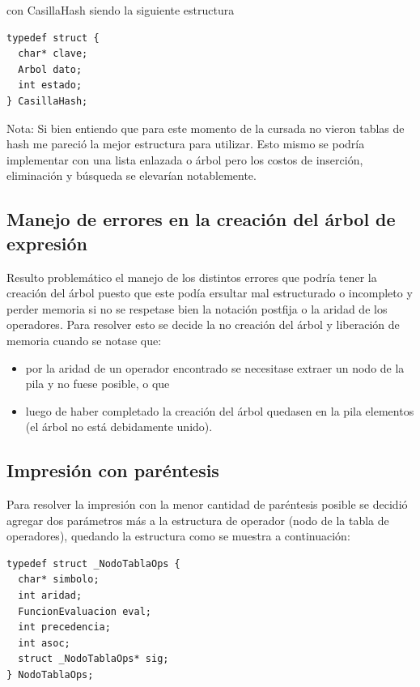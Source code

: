 \documentclass[11pt]{article}
\begin{document}
con CasillaHash siendo la siguiente estructura 

\begin{lstlisting}[style = CStyle]
typedef struct {
  char* clave;
  Arbol dato;
  int estado;
} CasillaHash;
\end{lstlisting}

Nota: Si bien entiendo que para este momento de la cursada no vieron tablas de hash me pareci\'o la mejor estructura para utilizar. Esto mismo se podría implementar con una lista enlazada o \'arbol pero los costos de inserci\'on, eliminaci\'on y b\'usqueda se elevar\'ian notablemente. 

\subsection{Manejo de errores en la creaci\'on del \'arbol de expresi\'on}
Resulto problem\'atico el manejo de los distintos errores que podr\'ia tener la creaci\'on del \'arbol puesto que este pod\'ia ersultar mal estructurado o incompleto y perder memoria si no se respetase bien la notaci\'on postfija o la aridad de los operadores. Para resolver esto se decide la no creaci\'on del \'arbol y liberaci\'on de memoria cuando se notase que: 

\begin{itemize}
    \item por la aridad de un operador encontrado se necesitase extraer un nodo de la pila y no fuese posible, o que
    \item luego de haber completado la creaci\'on del \'arbol quedasen en la pila elementos (el \'arbol no est\'a debidamente unido).
\end{itemize}

\subsection{Impresi\'on con par\'entesis}
Para resolver la impresi\'on con la menor cantidad de par\'entesis posible se decidi\'o agregar dos par\'ametros m\'as a la estructura de operador (nodo de la tabla de operadores), quedando la estructura como se muestra a continuaci\'on: 

\begin{lstlisting}[style = CStyle]
typedef struct _NodoTablaOps {
  char* simbolo;
  int aridad;
  FuncionEvaluacion eval;
  int precedencia;
  int asoc;
  struct _NodoTablaOps* sig;
} NodoTablaOps;
\end{lstlisting}
\end{document}

